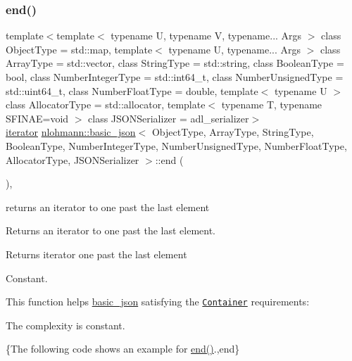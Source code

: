 \subsubsection{\texorpdfstring{end()}{end()}\hspace{0.1cm}{\footnotesize\ttfamily [1/2]}}
{\footnotesize\ttfamily template$<$template$<$ typename U, typename V, typename... Args $>$ class Object\+Type = std\+::map, template$<$ typename U, typename... Args $>$ class Array\+Type = std\+::vector, class String\+Type  = std\+::string, class Boolean\+Type  = bool, class Number\+Integer\+Type  = std\+::int64\+\_\+t, class Number\+Unsigned\+Type  = std\+::uint64\+\_\+t, class Number\+Float\+Type  = double, template$<$ typename U $>$ class Allocator\+Type = std\+::allocator, template$<$ typename T, typename S\+F\+I\+N\+A\+E=void $>$ class J\+S\+O\+N\+Serializer = adl\+\_\+serializer$>$ \\
\mbox{\hyperlink{classnlohmann_1_1basic__json_a099316232c76c034030a38faa6e34dca}{iterator}} \mbox{\hyperlink{classnlohmann_1_1basic__json}{nlohmann\+::basic\+\_\+json}}$<$ Object\+Type, Array\+Type, String\+Type, Boolean\+Type, Number\+Integer\+Type, Number\+Unsigned\+Type, Number\+Float\+Type, Allocator\+Type, J\+S\+O\+N\+Serializer $>$\+::end (\begin{DoxyParamCaption}{ }\end{DoxyParamCaption})\hspace{0.3cm}{\ttfamily [inline]}, {\ttfamily [noexcept]}}



returns an iterator to one past the last element 

Returns an iterator to one past the last element.

 \begin{DoxyReturn}{Returns}
iterator one past the last element
\end{DoxyReturn}
Constant.

This function helps {\ttfamily \mbox{\hyperlink{classnlohmann_1_1basic__json}{basic\+\_\+json}}} satisfying the \href{https://en.cppreference.com/w/cpp/named_req/Container}{\tt Container} requirements\+:
\begin{DoxyItemize}
\item The complexity is constant.
\end{DoxyItemize}

\{The following code shows an example for {\ttfamily \mbox{\hyperlink{classnlohmann_1_1basic__json_a13e032a02a7fd8a93fdddc2fcbc4763c}{end()}}}.,end\}

